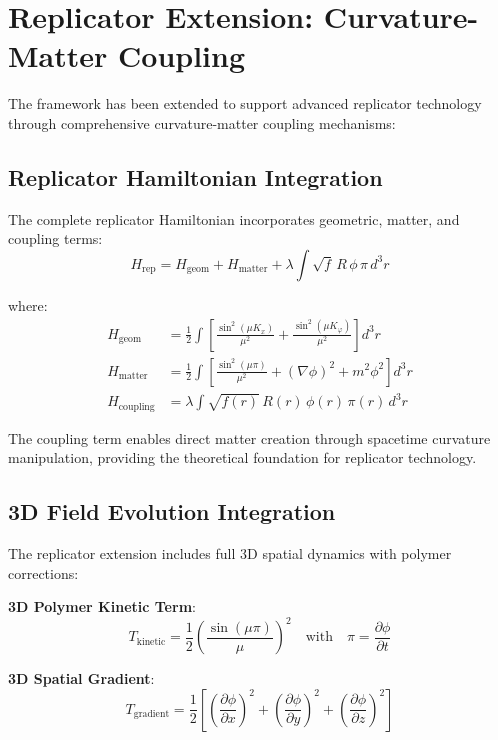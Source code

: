 \documentclass[11pt]{article}
\begin{document}
\section{Replicator Extension: Curvature-Matter Coupling}

The framework has been extended to support advanced replicator technology through comprehensive curvature-matter coupling mechanisms:

\subsection{Replicator Hamiltonian Integration}

The complete replicator Hamiltonian incorporates geometric, matter, and coupling terms:
\begin{equation}
H_{\text{rep}} = H_{\text{geom}} + H_{\text{matter}} + \lambda \int \sqrt{f} \, R \, \phi \, \pi \, d^3r
\end{equation}

where:
\begin{align}
H_{\text{geom}} &= \frac{1}{2} \int \left[\frac{\sin^2(\mu K_x)}{\mu^2} + \frac{\sin^2(\mu K_\varphi)}{\mu^2}\right] d^3r \\
H_{\text{matter}} &= \frac{1}{2} \int \left[\frac{\sin^2(\mu \pi)}{\mu^2} + (\nabla \phi)^2 + m^2 \phi^2\right] d^3r \\
H_{\text{coupling}} &= \lambda \int \sqrt{f(r)} \, R(r) \, \phi(r) \, \pi(r) \, d^3r
\end{align}

The coupling term enables direct matter creation through spacetime curvature manipulation, providing the theoretical foundation for replicator technology.

\subsection{3D Field Evolution Integration}

The replicator extension includes full 3D spatial dynamics with polymer corrections:

\textbf{3D Polymer Kinetic Term}:
\begin{equation}
T_{\text{kinetic}} = \frac{1}{2} \left(\frac{\sin(\mu \pi)}{\mu}\right)^2 \quad \text{with} \quad \pi = \frac{\partial \phi}{\partial t}
\end{equation}

\textbf{3D Spatial Gradient}:
\begin{equation}
T_{\text{gradient}} = \frac{1}{2} \left[\left(\frac{\partial \phi}{\partial x}\right)^2 + \left(\frac{\partial \phi}{\partial y}\right)^2 + \left(\frac{\partial \phi}{\partial z}\right)^2\right]
\end{equation}
\end{document}

